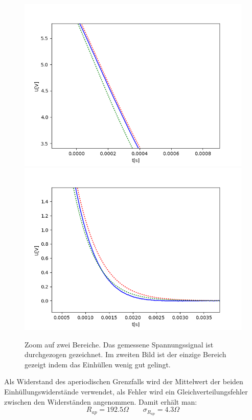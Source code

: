 \documentclass[12pt,a4paper]{article}
\begin{document}
\begin{figure}
\begin{center}
\includegraphics[scale=0.4]{Bilder/Aperiodisch1}
\includegraphics[scale=0.4]{Bilder/Aperiodisch2}
\end{center}
\caption{Zoom auf zwei Bereiche. Das gemessene Spannungssignal ist durchgezogen gezeichnet. Im zweiten Bild ist der einzige Bereich gezeigt indem das Einhüllen wenig gut gelingt.}
\label{fig:Aperiodisch}
\end{figure}

Als Widerstand des aperiodischen Grenzfalls wird der Mittelwert der beiden Einhüllungswiderstände verwendet, als Fehler wird ein Gleichverteilungsfehler zwischen den Widerständen angenommen. Damit erhält man:
\begin{equation}
R_{ap}=192.5\Omega \quad \quad \sigma_{R_{ap}}=4.3\Omega
\end{equation}
\end{document}
